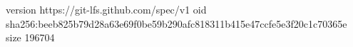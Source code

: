 version https://git-lfs.github.com/spec/v1
oid sha256:beeb825b79d28a63e69f0be59b290afc818311b415e47ccfe5e3f20c1c70365e
size 196704
